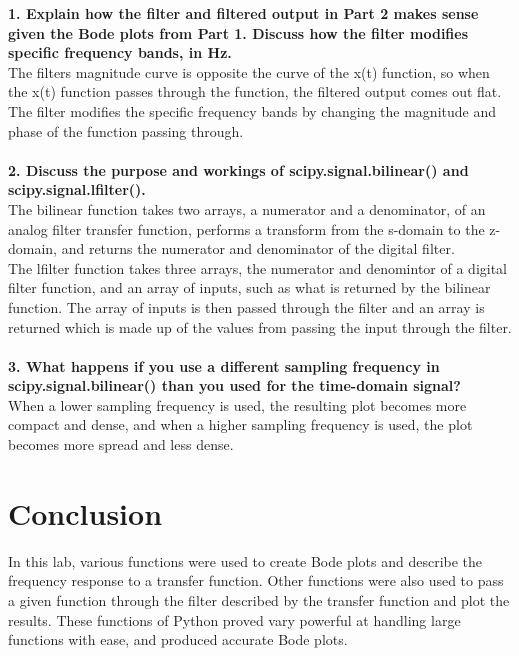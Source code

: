 \documentclass[12pt]{report}
\begin{document}
\textbf{1. Explain how the filter and filtered output in Part 2 makes sense given the Bode plots from Part 1. Discuss how the filter modifies specific frequency bands, in Hz.}
\\The filters magnitude curve is opposite the curve of the x(t) function, so when the x(t) function passes through the function, the filtered output comes out flat. The filter modifies the specific frequency bands by changing the magnitude and phase of the function passing through.
\\
\\ \textbf{2. Discuss the purpose and workings of scipy.signal.bilinear() and scipy.signal.lfilter().}
\\ The bilinear function takes two arrays, a numerator and a denominator, of an analog filter transfer function, performs a transform from the s-domain to the z-domain, and returns the numerator and denominator of the digital filter.
\\The lfilter function takes three arrays, the numerator and denomintor of a digital filter function, and an array of inputs, such as what is returned by the bilinear function. The array of inputs is then passed through the filter and an array is returned which is made up of the values from passing the input through the filter. 
\\
\\ \textbf{3. What happens if you use a different sampling frequency in scipy.signal.bilinear() than you used for the time-domain signal?}
\\ When a lower sampling frequency is used, the resulting plot becomes more compact and dense, and when a higher sampling frequency is used, the plot becomes more spread and less dense.
\section{Conclusion}
In this lab, various functions were used to create Bode plots and describe the frequency response to a transfer function. Other functions were also used to pass a given function through the filter described by the transfer function and plot the results. These functions of Python proved vary powerful at handling large functions with ease, and produced accurate Bode plots.
\end{document}
